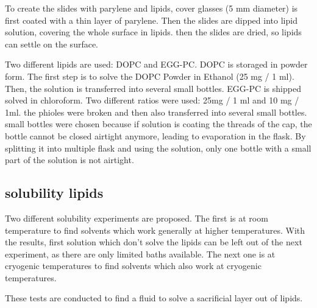 To create the slides with parylene and lipids, cover glasses (5 mm diameter) is first coated with a thin layer of parylene. Then the slides are dipped into lipid solution, covering the whole surface in lipids. then the slides are dried, so lipids can settle on the surface. 

Two different lipids are used: DOPC and EGG-PC. DOPC is storaged in powder form. The first step is to solve the DOPC Powder in Ethanol (25 mg / 1 ml). Then, the solution is transferred into several small bottles. EGG-PC is shipped solved in chloroform. Two different ratios were used: 25mg / 1 ml and 10 mg / 1ml. the phioles were broken and then also transferred into several small bottles. small bottles were chosen because if solution is coating the threads of the cap, the bottle cannot be closed airtight anymore, leading to evaporation in the flask. By splitting it into multiple flask and using the solution, only one bottle with a small part of the solution is not airtight.

\subsection{solubility lipids}

Two different solubility experiments are proposed. The first is at room temperature to find solvents which work generally at higher temperatures. With the results, first solution which don't solve the lipids can be left out of the next experiment, as there are only limited baths available. The next one is at cryogenic temperatures to find solvents which also work at cryogenic temperatures.

These tests are conducted to find a fluid to solve a sacrificial layer out of lipids.

\begin{comment}
\begin{figure}[hbt!]
	\centering
	\begin{picture}(6,3)
		\multiput(0,0)(6,0){2}{\line(0,1){1.25}}
		\put(0,0){\line(1,0){6}}
		\multiput(0,.5)(0,.25){4}{\line(1,0){6}}
		\multiput(0,0)(0.5,0){12}{\line(1,1){0.5}}
		\multiput(6,0.5)(-0.25,0){24}{\line(-1,1){0.25}}
		\thicklines
		\put(-1,.25){\vector(1,0){1}}
		\put(-1,.25){\makebox(0,0)[r]{Slide}}
		\put(7,.625){\vector(-1,0){1}}
		\put(7,.625){\makebox(0,0)[l]{Parylene}}
		\put(-1,.875){\vector(1,0){1}}
		\put(-1,.875){\makebox(0,0)[r]{Lipid Layer}}
		\put(7,1.125){\vector(-1,0){1}}
		\put(7,1.125){\makebox(0,0)[l]{Ice}}
	\end{picture}
	\caption{Sacrificial layer}
	\label{fig:sacrificial layer}
\end{figure}
\end{comment}

